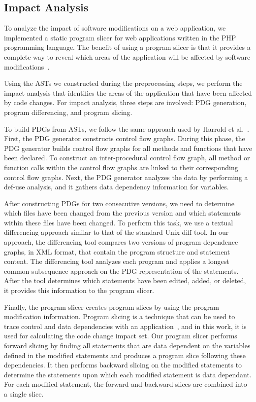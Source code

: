 
\subsection{Impact Analysis}

To analyze the impact of software modifications on a web
application, we implemented a static program slicer for web
applications written in the PHP programming language. 
The benefit of using a program slicer is that it provides 
a complete way to reveal which areas of the application will 
be affected by software modifications~\cite{agrawal90}.

Using the ASTs we constructed during the preprocessing steps, 
we perform the impact analysis that identifies the areas of 
the application that have been affected by code changes. 
For impact analysis, three steps are involved: PDG generation,
program differencing, and program slicing. 

To build PDGs from ASTs, we follow the same approach
used by Harrold et al.~\cite{harrold93}. 
First, the PDG generator constructs control flow graphs. 
During this phase, the PDG generator builds control flow graphs 
for all methods and functions that have been declared. 
To construct an inter-procedural control flow graph, all method 
or function calls within the control flow graphs are linked to 
their corresponding control flow graphs.
Next, the PDG generator analyzes the data by performing a def-use 
analysis, and it gathers data dependency information for variables. 

After constructing PDGs for two consecutive versions,
we need to determine which files have been changed from the
previous version and which statements within these files have
 been changed. To perform this task, we use a textual differencing 
approach similar to that of the standard Unix diff tool. In our 
approach, the differencing tool compares two versions of program 
dependence graphs, in XML format, that contain the program structure 
and statement content. The differencing tool analyzes each program 
and applies a longest common subsequence approach on the PDG 
representation of the statements.
After the tool determines which statements have been edited, added, 
or deleted, it provides this information to the program slicer.

Finally, the program slicer creates program slices by using
the program modification information. Program slicing is a technique 
that can be used to trace control and data dependencies with 
an application~\cite{weiser81}, and in this work, it is used for 
calculating the code change impact set. Our program slicer performs 
forward slicing by finding all statements that are data dependent on 
the variables defined in the modified statements and produces a program 
slice following these dependencies. It then performs backward slicing 
on the modified statements to determine the statements upon which each 
modified statement is data dependant. For each modified statement, 
the forward and backward slices are combined into a single slice.

